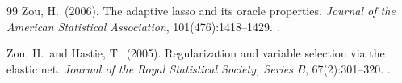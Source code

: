 \documentclass[12pt,a4paper]{article}
\begin{document}
\begin{thebibliography}{99}
Zou, H.\ (2006).
\newblock The adaptive lasso and its oracle properties.
\newblock \emph{Journal of the American Statistical Association},
  101(476):1418--1429.
\newblock {}.

Zou, H.\ and Hastie, T.\ (2005).
\newblock Regularization and variable selection via the elastic net.
\newblock \emph{Journal of the Royal Statistical Society, Series B},
  67(2):301--320.
\newblock {}.

\end{thebibliography}
\end{document}
